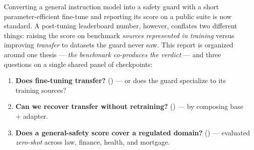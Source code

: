 \documentclass[11pt]{article}
\begin{document}
Converting a general instruction model into a safety guard with a short parameter-efficient fine-tune
\citep{elesedy2024loraguard} and reporting its score on a public suite \citep{bassani2024guardbench}
is now standard. A post-tuning leaderboard number, however, conflates two different things: raising the
score on benchmark \emph{sources represented in training} versus improving \emph{transfer} to datasets
the guard never saw. This report is organized around one thesis --- \emph{the benchmark co-produces the
verdict} --- and three questions on a single shared panel of checkpoints:
\begin{enumerate}[leftmargin=1.6em,itemsep=1pt]
  \item \textbf{Does fine-tuning transfer?} () --- or does the guard specialize to its training sources?
  \item \textbf{Can we recover transfer without retraining?} () --- by composing base $+$ adapter.
  \item \textbf{Does a general-safety score cover a regulated domain?} () --- evaluated \emph{zero-shot} across law, finance, health, and mortgage.
\end{enumerate}
\end{document}

